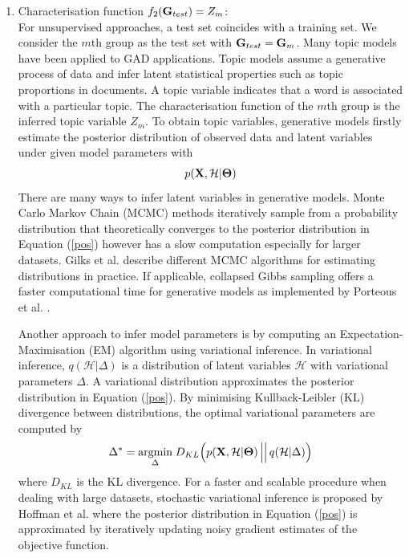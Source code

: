\begin{enumerate}[2.]
\item Characterisation function $f_2({\bf G}_{test})=Z_m$: \\ 
For unsupervised approaches, a test set coincides with a training set. We consider the $m$th group as the test set with  ${\bf G}_{test}={\bf G}_{m}$.  Many topic models have been applied to GAD applications. Topic models assume a generative process of data and  infer latent statistical properties such as topic proportions in documents. A topic variable indicates that a word is associated with a particular topic.  The characterisation function of the $m$th group is the inferred topic variable $ Z_m$.  
To obtain topic variables, generative models firstly estimate the posterior distribution of observed data and latent variables under given model parameters with %
\begin{align}
p({\bf X},\mathcal{H}| \boldsymbol\Theta) \label{pos}
\end{align}
There are many ways to infer latent variables in  generative models. %
Monte Carlo Markov Chain (MCMC) methods iteratively  sample from a probability distribution that theoretically converges to the posterior distribution in Equation (\ref{pos}) %
however has a slow computation especially for larger datasets. Gilks et al. \cite{MCMC} describe different MCMC algorithms for estimating distributions in practice. If applicable, collapsed Gibbs sampling offers a faster computational time for generative models as implemented by Porteous et al. \cite{fastCGS}.


 Another approach to infer model parameters   is by   computing an Expectation-Maximisation (EM) algorithm  
  using variational inference. In variational inference, $q(\mathcal{H}|\Delta)$ is a  distribution of latent variables  $\mathcal{H}$ with variational parameters $\Delta$. A variational distribution approximates the  posterior distribution in Equation (\ref{pos}). By  minimising Kullback-Leibler (KL) divergence between distributions, the optimal variational parameters are computed by 
\[ 
\Delta^* =  \underset {\Delta }{\mbox{argmin}} \;
D_{KL} \Big( p({\bf X},\mathcal{H}|   \boldsymbol\Theta) \,\Big|\Big|\,  q(\mathcal{H}|\Delta) \Big)
\]
where $D_{KL}$ is the KL divergence. For a faster and scalable procedure when dealing with large datasets, stochastic variational inference is proposed by Hoffman et al.    \cite{stochasticVI}    where the posterior distribution in  Equation (\ref{pos}) is approximated by iteratively  updating noisy gradient estimates of the objective function. 
\end{enumerate}
 
